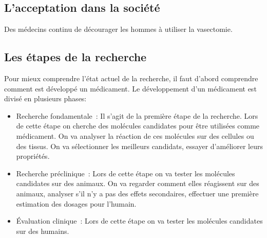 \documentclass[12pt,a4paper]{report}
\begin{document}
\section{L'acceptation dans la société}



Des médecins continu de décourager les hommes à utiliser la vasectomie. \cite{SiContraceptionEtait2021}

\listoffigures


\begin{appendix}

    \chapter{Les étapes de la recherche} \label{annexe:etapes_recherche}

    Pour mieux comprendre l'état actuel de la recherche, il faut d'abord comprendre comment est développé un médicament.
Le développement d'un médicament est divisé en plusieurs phases: \cite{DeveloppementMedicamentInserm}

\begin{itemize}
    \item Recherche fondamentale : Il s'agit de la première étape de la recherche.
    Lors de cette étape on cherche des molécules candidates pour être utilisées comme médicament.
    On va analyser la réaction de ces molécules sur des cellules ou des tissus.
    On va sélectionner les meilleurs candidats, essayer d'améliorer leurs propriétés.

    \item Recherche préclinique : Lors de cette étape on va tester les molécules candidates sur des animaux.
    On va regarder comment elles réagissent sur des animaux, analyser s'il n'y a pas des effets secondaires, effectuer une première estimation des dosages pour l'humain.

    \item Évaluation clinique : Lors de cette étape on va tester les molécules candidates sur des humains.


\end{itemize}
\end{appendix}
\end{document}
